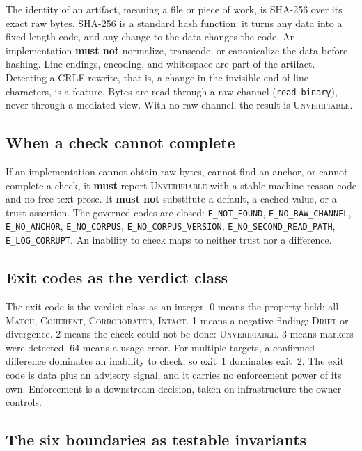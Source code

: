 \documentclass[11pt]{article}
\begin{document}
The identity of an artifact, meaning a file or piece of work, is SHA-256 over its exact raw bytes. SHA-256 is a standard hash function: it turns any data into a fixed-length code, and any change to the data changes the code. An implementation \textbf{must not} normalize, transcode, or canonicalize the data before hashing. Line endings, encoding, and whitespace are part of the artifact. Detecting a CRLF rewrite, that is, a change in the invisible end-of-line characters, is a feature. Bytes are read through a raw channel (\texttt{read\_binary}), never through a mediated view. With no raw channel, the result is \textsc{Unverifiable}.

\subsection{When a check cannot complete}

If an implementation cannot obtain raw bytes, cannot find an anchor, or cannot complete a check, it \textbf{must} report \textsc{Unverifiable} with a stable machine reason code and no free-text prose. It \textbf{must not} substitute a default, a cached value, or a trust assertion. The governed codes are closed: \texttt{E\_NOT\_FOUND}, \texttt{E\_NO\_RAW\_CHANNEL}, \texttt{E\_NO\_ANCHOR}, \texttt{E\_NO\_CORPUS}, \texttt{E\_NO\_CORPUS\_VERSION}, \texttt{E\_NO\_SECOND\_READ\_PATH}, \texttt{E\_LOG\_CORRUPT}. An inability to check maps to neither trust nor a difference.

\subsection{Exit codes as the verdict class}

The exit code is the verdict class as an integer. 0 means the property held: all \textsc{Match}, \textsc{Coherent}, \textsc{Corroborated}, \textsc{Intact}. 1 means a negative finding: \textsc{Drift} or divergence. 2 means the check could not be done: \textsc{Unverifiable}. 3 means markers were detected. 64 means a usage error. For multiple targets, a confirmed difference dominates an inability to check, so exit~1 dominates exit~2. The exit code is data plus an advisory signal, and it carries no enforcement power of its own. Enforcement is a downstream decision, taken on infrastructure the owner controls.

\subsection{The six boundaries as testable invariants}
\end{document}
